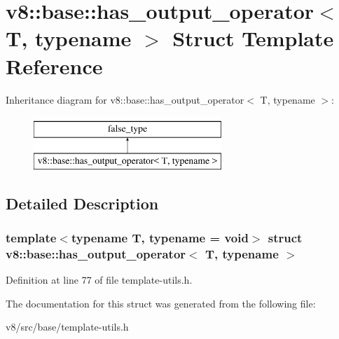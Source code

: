 \hypertarget{structv8_1_1base_1_1has__output__operator}{}\section{v8\+:\+:base\+:\+:has\+\_\+output\+\_\+operator$<$ T, typename $>$ Struct Template Reference}
\label{structv8_1_1base_1_1has__output__operator}
Inheritance diagram for v8\+:\+:base\+:\+:has\+\_\+output\+\_\+operator$<$ T, typename $>$\+:\begin{figure}[H]
\begin{center}
\leavevmode
\includegraphics[height=2.000000cm]{structv8_1_1base_1_1has__output__operator}
\end{center}
\end{figure}


\subsection{Detailed Description}
\subsubsection*{template$<$typename T, typename = void$>$\newline
struct v8\+::base\+::has\+\_\+output\+\_\+operator$<$ T, typename $>$}



Definition at line 77 of file template-\/utils.\+h.



The documentation for this struct was generated from the following file\+:\begin{DoxyCompactItemize}
\item 
v8/src/base/template-\/utils.\+h\end{DoxyCompactItemize}
